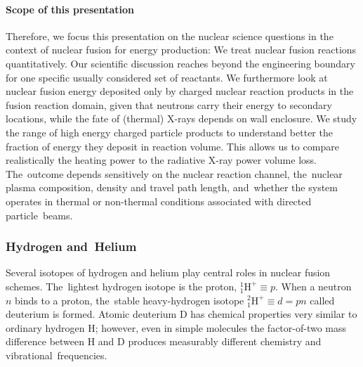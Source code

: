 \documentclass[particles,article,accept,pdftex,moreauthors]{Definitions/mdpi}
\begin{document}
\vspace{-6pt}\paragraph*{\bf Scope of this presentation}
Therefore, we focus this presentation on the nuclear science questions in the context of nuclear fusion for energy production: We treat nuclear fusion reactions quantitatively. Our scientific discussion reaches beyond the engineering boundary for one specific usually considered set of reactants. We furthermore look at nuclear fusion energy deposited only by charged nuclear reaction products in the fusion reaction domain, given that neutrons carry their energy to secondary locations, while the fate of (thermal) X-rays depends on wall enclosure. We study the range of high energy charged particle products to understand better the fraction of energy they deposit in reaction volume. This allows us to compare realistically the heating power to the radiative X-ray power volume loss. The~outcome depends sensitively on the nuclear reaction channel, the~nuclear plasma composition, density and travel path length, and~whether the system operates in thermal or non-thermal conditions associated with directed particle~beams.

 \subsubsection{Hydrogen and~Helium}\label{sssec:HHe}
Several isotopes of hydrogen and helium play central roles in nuclear fusion schemes. The~lightest hydrogen isotope is the proton, ${}^{1\!}_{1\!}\mathrm{H}^+\equiv p$. When a neutron $n$ binds to a proton, the~stable heavy-hydrogen isotope ${}^{2\!}_{1\!}\mathrm{H}^+\equiv d=pn$ called deuterium is formed. Atomic deuterium D has chemical properties very similar to ordinary hydrogen H; however, even in simple molecules the factor-of-two mass difference between H and D produces measurably different chemistry and vibrational~frequencies.
\end{document}
